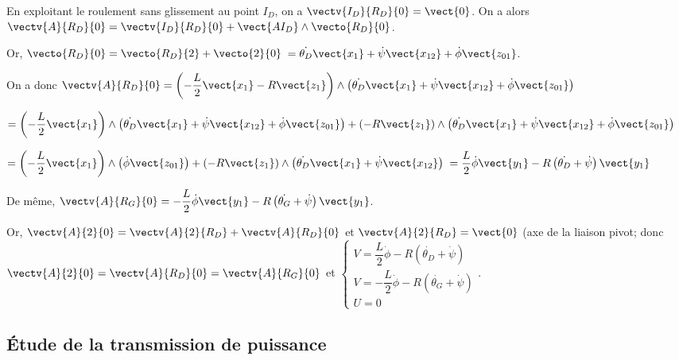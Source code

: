 \ifprof
\begin{corrige}
En exploitant le roulement sans glissement au point $I_D$, on a $\vectv{I_D}{R_D}{0}=\vect{0}$. 
On a alors $\vectv{A}{R_D}{0} = \vectv{I_D}{R_D}{0} + \vect{A I_D} \wedge \vecto{R_D}{0}$.

Or, $\vecto{R_D}{0}= \vecto{R_D}{2}+\vecto{2}{0}$ $=\dot{\theta_D}\vect{x_1}+\dot{\psi}\vect{x_{12}}+\dot{\phi}\vect{z_{01}}$.

On a donc 
$\vectv{A}{R_D}{0} = \left(-\dfrac{L}{2}\vect{x_1}-R\vect{z_1}\right)\wedge \left(\dot{\theta_D}\vect{x_1}+\dot{\psi}\vect{x_{12}}+\dot{\phi}\vect{z_{01}}\right)$

$=\left(-\dfrac{L}{2}\vect{x_1}\right)\wedge \left(\dot{\theta_D}\vect{x_1}+\dot{\psi}\vect{x_{12}}+\dot{\phi}\vect{z_{01}}\right)+\left(-R\vect{z_1}\right)\wedge \left(\dot{\theta_D}\vect{x_1}+\dot{\psi}\vect{x_{12}}+\dot{\phi}\vect{z_{01}}\right)$

$=\left(-\dfrac{L}{2}\vect{x_1}\right)\wedge \left(\dot{\phi}\vect{z_{01}}\right)+\left(-R\vect{z_1}\right)\wedge \left(\dot{\theta_D}\vect{x_1}+\dot{\psi}\vect{x_{12}}\right)$
$=\dfrac{L}{2}\dot{\phi}\vect{y_{1}}-R\left(\dot{\theta_D}+\dot{\psi}\right)\vect{y_1}$

De même, $\vectv{A}{R_G}{0}=-\dfrac{L}{2}\dot{\phi}\vect{y_{1}}-R\left(\dot{\theta_G}+\dot{\psi}\right)\vect{y_1}$.


Or, $\vectv{A}{2}{0} = \vectv{A}{2}{R_D} + \vectv{A}{R_D}{0}$ et $\vectv{A}{2}{R_D} = \vect{0}$ (axe de la liaison pivot; donc $\vectv{A}{2}{0} = \vectv{A}{R_D}{0} = \vectv{A}{R_G}{0}$ et 
$
\left\{
\begin{array}{l}
V = \dfrac{L}{2}\dot{\phi}-R\left(\dot{\theta_D}+\dot{\psi}\right) \\
V = -\dfrac{L}{2}\dot{\phi}-R\left(\dot{\theta_G}+\dot{\psi}\right) \\
U = 0
\end{array}
\right.
$.
\end{corrige}
\else
\fi

\subsection{\'Etude de la transmission de puissance}
\ifprof
\else

